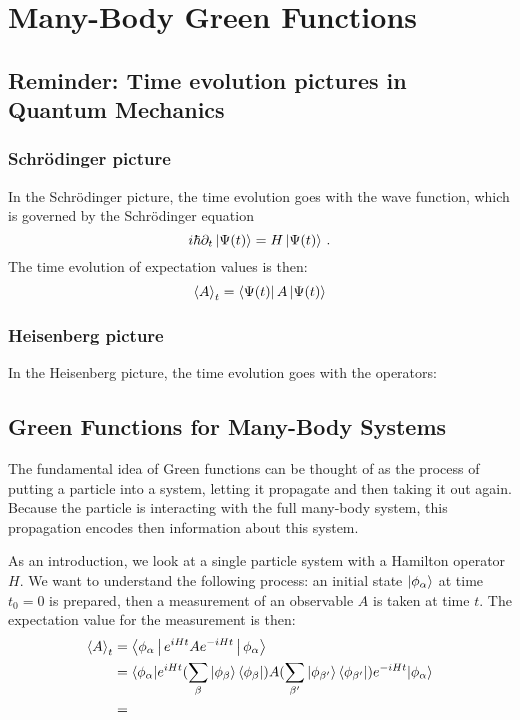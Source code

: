 \documentclass[../classnotes.tex]{subfiles}
\begin{document}
\chapter{Many-Body Green Functions}\label{ch:many-body-green-functions}

\section{Reminder: Time evolution pictures in Quantum Mechanics}\label{sec:reminder:-time-evolution-pictures-in-quantum-mechanics}

\subsection{Schrödinger picture}\label{subsec:schrodinger-picture}

In the Schrödinger picture, the time evolution goes with the wave function, which is governed by the Schrödinger equation
\begin{equation}
    i \hbar \partial_t \ket{\Psi(t)} = H \ket{\Psi(t)}\,.
\end{equation}
The time evolution of expectation values is then:
\begin{equation}
    \braket{A}_t = \bra{\Psi(t)} A \ket{\Psi(t)}
\end{equation}

\subsection{Heisenberg picture}\label{subsec:heisenberg-picture}

In the Heisenberg picture, the time evolution goes with the operators:


\section{Green Functions for Many-Body Systems}\label{sec:green-functions-for-many-body-systems}

The fundamental idea of Green functions can be thought of as the process of putting a particle into a system, letting it propagate and then taking it out again.
Because the particle is interacting with the full many-body system, this propagation encodes then information about this system.

As an introduction, we look at a single particle system with a Hamilton operator \(H\).
We want to understand the following process: an initial state \(\ket{\phi_{\alpha}}\) at time \(t_0 = 0\) is prepared, then a measurement of an observable \(A\) is taken at time \(t\).
The expectation value for the measurement is then:
\begin{align}
    \Braket{A}_t &= \Braket{\phi_{\alpha} | e^{i H t} A e^{- i H t} | \phi_{\alpha}} \\
    &= \braket{\phi_{\alpha} | e^{i H t} (\sum_{\beta} \ket{\phi_{\beta}} \bra{\phi_{\beta}}) A (\sum_{\beta^{\prime}} \ket{\phi_{\beta^{\prime}}} \bra{\phi_{\beta^{\prime}}}) e^{- i H t} | \phi_{\alpha}} \\
    &= 
\end{align}
\end{document}
